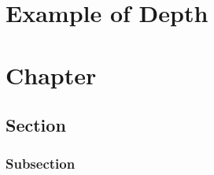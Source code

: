 \documentclass{depth_book}
\begin{document}
\chapter*{Example of Depth}
\blindtext[2]

\chapter{Chapter}
\blindtext[2]
\section{Section}
\blindtext[2]
\subsection{Subsection}
\blindtext[2]
\end{document}
